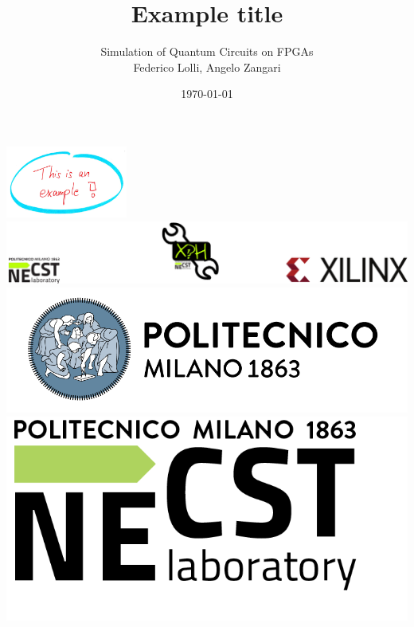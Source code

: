 \documentclass[12pt,oneside,a4paper]{article}
\title{\textbf{Example title}}
\author{Simulation of Quantum Circuits on FPGAs\\Federico Lolli, Angelo Zangari}
\date{\today}
\begin{document}
\begin{titlepage}
    \centering
    \clearpage
    \maketitle
	\thispagestyle{empty}
	\vspace*{1cm}
	\includegraphics[width=4cm]{example.jpg} %
	\vfill
	\centering
	\includegraphics{footer.png}
	\includegraphics{logo_polimi.png}\includegraphics{logo_NECST.png}
\end{titlepage}
\end{document}

